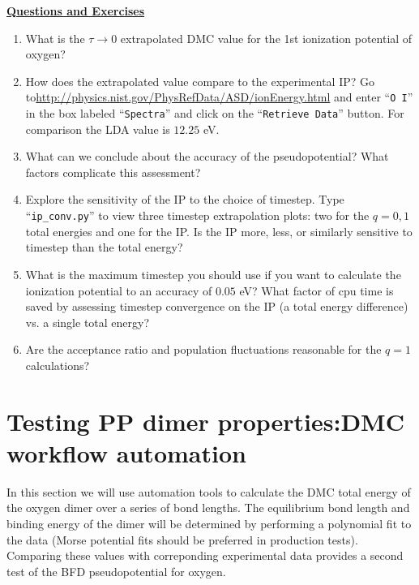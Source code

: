 \vspace{1cm}
\begin{flushleft}
\textbf{\underline{Questions and Exercises}}
\end{flushleft}
\begin{enumerate}
  \item{What is the $\tau\rightarrow 0$ extrapolated DMC value for the 1st ionization potential of oxygen?}
  \item{How does the extrapolated value compare to the experimental IP?  Go to\newline \href{http://physics.nist.gov/PhysRefData/ASD/ionEnergy.html}{http://physics.nist.gov/PhysRefData/ASD/ionEnergy.html} and enter ``\texttt{O I}'' in the box labeled ``\texttt{Spectra}'' and click on the ``\texttt{Retrieve Data}'' button.  For comparison the LDA value is $12.25$ eV.}
  \item{What can we conclude about the accuracy of the pseudopotential?  What factors complicate this assessment?}
  \item{Explore the sensitivity of the IP to the choice of timestep.  Type ``\texttt{ip\_conv.py}'' to view three timestep extrapolation plots: two for the $q=0,1$ total energies and one for the IP.  Is the IP more, less, or similarly sensitive to timestep than the total energy?}
  \item{What is the maximum timestep you should use if you want to calculate the ionization potential to an accuracy of $0.05$ eV?  What factor of cpu time is saved by assessing timestep convergence on the IP (a total energy difference) vs. a single total energy?}
  \item{Are the acceptance ratio and population fluctuations reasonable for the $q=1$ calculations?}
\end{enumerate}




\section{Testing PP dimer properties:\newline DMC workflow automation}
\label{sec:dimer_automation}
In this section we will use automation tools to calculate the DMC total energy of the oxygen dimer over a series of bond lengths.  The equilibrium bond length and binding energy of the dimer will be determined by performing a polynomial fit to the data (Morse potential fits should be preferred in production tests).  Comparing these values with correponding experimental data provides a second test of the BFD pseudopotential for oxygen.


